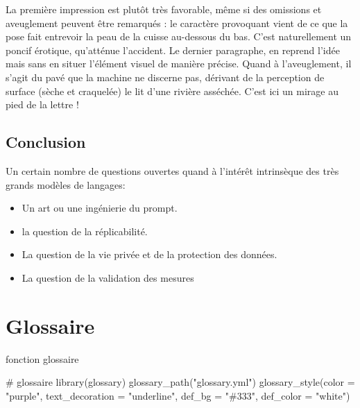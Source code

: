 \documentclass[
  letterpaper,
  DIV=11,
  numbers=noendperiod]{scrreprt}
\newenvironment{Shaded}{\begin{snugshade}}{\end{snugshade}}
\newcommand{\AttributeTok}[1]{\textcolor[rgb]{0.40,0.45,0.13}{#1}}
\newcommand{\CommentTok}[1]{\textcolor[rgb]{0.37,0.37,0.37}{#1}}
\newcommand{\FunctionTok}[1]{\textcolor[rgb]{0.28,0.35,0.67}{#1}}
\newcommand{\NormalTok}[1]{\textcolor[rgb]{0.00,0.23,0.31}{#1}}
\newcommand{\StringTok}[1]{\textcolor[rgb]{0.13,0.47,0.30}{#1}}
\providecommand{\tightlist}{%
  \setlength{\itemsep}{0pt}\setlength{\parskip}{0pt}}\usepackage{longtable,booktabs,array}
\begin{document}
La première impression est plutôt très favorable, même si des omissions
et aveuglement peuvent être remarqués : le caractère provoquant vient de
ce que la pose fait entrevoir la peau de la cuisse au-dessous du bas.
C'est naturellement un poncif érotique, qu'atténue l'accident. Le
dernier paragraphe, en reprend l'idée mais sans en situer l'élément
visuel de manière précise. Quand à l'aveuglement, il s'agit du pavé que
la machine ne discerne pas, dérivant de la perception de surface (sèche
et craquelée) le lit d'une rivière asséchée. C'est ici un mirage au pied
de la lettre !

\section{Conclusion}\label{conclusion-15}

Un certain nombre de questions ouvertes quand à l'intérêt intrinsèque
des très grands modèles de langages:

\begin{itemize}
\tightlist
\item
  Un art ou une ingénierie du prompt.
\item
  la question de la réplicabilité.
\item
  La question de la vie privée et de la protection des données.
\item
  La question de la validation des mesures
\end{itemize}


\chapter*{Glossaire}\label{glossaire}


fonction glossaire

\begin{Shaded}
\begin{Highlighting}[]
\CommentTok{\# glossaire}
\FunctionTok{library}\NormalTok{(glossary)}
\FunctionTok{glossary\_path}\NormalTok{(}\StringTok{"glossary.yml"}\NormalTok{)}
\FunctionTok{glossary\_style}\NormalTok{(}\AttributeTok{color =} \StringTok{"purple"}\NormalTok{, }
               \AttributeTok{text\_decoration =} \StringTok{"underline"}\NormalTok{,}
               \AttributeTok{def\_bg =} \StringTok{"\#333"}\NormalTok{,}
               \AttributeTok{def\_color =} \StringTok{"white"}\NormalTok{)}
\end{Highlighting}
\end{Shaded}
\end{document}
